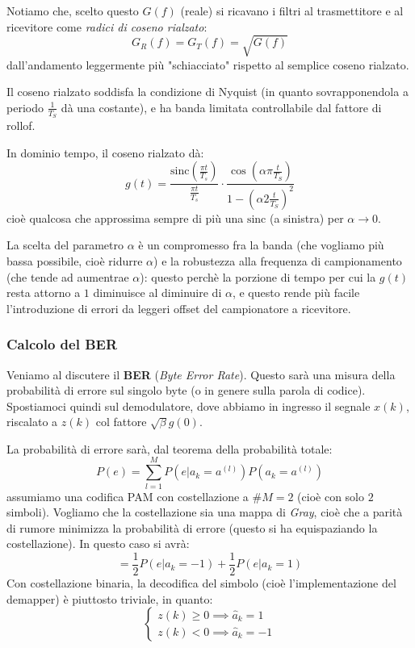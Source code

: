 \documentclass[a4paper,11pt]{article}
\begin{document}
Notiamo che, scelto questo $G(f)$ (reale) si ricavano i filtri al trasmettitore e al ricevitore come \textit{radici di coseno rialzato}:
$$
G_R(f) = G_T(f) = \sqrt{G(f)}
$$
dall'andamento leggermente più "schiacciato" rispetto al semplice coseno rialzato.

Il coseno rialzato soddisfa la condizione di Nyquist (in quanto sovrapponendola a periodo $\frac{1}{T_S}$ dà una costante), e ha banda limitata controllabile dal fattore di rollof. 

In dominio tempo, il coseno rialzato dà:
$$
g(t) = \frac{\mathrm{sinc} \left( \frac{\pi t}{T_s} \right)}{\frac{\pi t}{T_s}} \cdot \frac{\cos\left( \alpha \pi \frac{t}{T_S} \right)}{1 - \left(\alpha 2 \frac{t}{T_S}\right)^2}
$$
cioè qualcosa che approssima sempre di più una $\mathrm{sinc}$ (a sinistra) per $\alpha \rightarrow 0$.

La scelta del parametro $\alpha$ è un compromesso fra la banda (che vogliamo più bassa possibile, cioè ridurre $\alpha$) e la robustezza alla frequenza di campionamento (che tende ad aumentrae $\alpha$): questo perchè la porzione di tempo per cui la $g(t)$ resta attorno a $1$ diminuisce al diminuire di $\alpha$, e questo rende più facile l'introduzione di errori da leggeri offset del campionatore a ricevitore.

\subsubsection{Calcolo del BER}
Veniamo al discutere il \textbf{BER} (\textit{Byte Error Rate}).
Questo sarà una misura della probabilità di errore sul singolo byte (o in genere sulla parola di codice). Spostiamoci quindi sul demodulatore, dove abbiamo in ingresso il segnale $x(k)$, riscalato a $z(k)$ col fattore $\sqrt{\beta} g(0)$.

La probabilità di errore sarà, dal teorema della probabilità totale:
$$
P(e) = \sum_{l=1}^M P(e | a_k = a^{(l)}) P( a_k = a^{(l)} )
$$
assumiamo una codifica PAM con costellazione a $\# M = 2$ (cioè con solo $2$ simboli). Vogliamo che la costellazione sia una mappa di \textit{Gray}, cioè che a parità di rumore minimizza la probabilità di errore (questo si ha equispaziando la costellazione). In questo caso si avrà:
$$
= \frac{1}{2} P(e | a_k = -1) + \frac{1}{2} P(e | a_k = 1)
$$
Con costellazione binaria, la decodifica del simbolo (cioè l'implementazione del demapper) è piuttosto triviale, in quanto:
$$
\begin{cases}
z(k) \geq 0 \implies \hat{a}_k = 1  \\
z(k) < 0 \implies \hat{a}_k = -1
\end{cases}
$$
\end{document}
